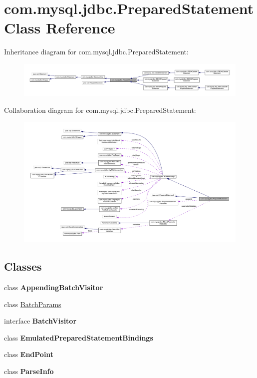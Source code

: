 \hypertarget{classcom_1_1mysql_1_1jdbc_1_1_prepared_statement}{}\section{com.\+mysql.\+jdbc.\+Prepared\+Statement Class Reference}
\label{classcom_1_1mysql_1_1jdbc_1_1_prepared_statement}


Inheritance diagram for com.\+mysql.\+jdbc.\+Prepared\+Statement\+:
\nopagebreak
\begin{figure}[H]
\begin{center}
\leavevmode
\includegraphics[width=350pt]{classcom_1_1mysql_1_1jdbc_1_1_prepared_statement__inherit__graph}
\end{center}
\end{figure}


Collaboration diagram for com.\+mysql.\+jdbc.\+Prepared\+Statement\+:
\nopagebreak
\begin{figure}[H]
\begin{center}
\leavevmode
\includegraphics[width=350pt]{classcom_1_1mysql_1_1jdbc_1_1_prepared_statement__coll__graph}
\end{center}
\end{figure}
\subsection*{Classes}
\begin{DoxyCompactItemize}
\item 
class {\bfseries Appending\+Batch\+Visitor}
\item 
class \mbox{\hyperlink{classcom_1_1mysql_1_1jdbc_1_1_prepared_statement_1_1_batch_params}{Batch\+Params}}
\item 
interface {\bfseries Batch\+Visitor}
\item 
class {\bfseries Emulated\+Prepared\+Statement\+Bindings}
\item 
class {\bfseries End\+Point}
\item 
class {\bfseries Parse\+Info}
\end{DoxyCompactItemize}
